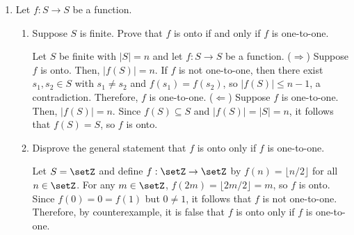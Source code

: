 \begin{enumerate}
\begin{enumerate}
\begin{subprove}
      Since \(g \circ f = h \circ f\), it follows that \((g \circ f)(s) = (h \circ f)(s)\).
      That is, \(g(f(s)) = h(f(s))\).
      Since \(f(s) = t\), it follows that \(g(t) = h(t)\).\proofstep
      Since \(t\) was arbitrary, it follows that for all \(t \in T\), \(g(t) = h(t)\).
      Therefore, \(g = h\).
    \end{subprove}
    \item Let \(h: S \to T\) be a function. Prove that if \(g\) is injective and \(g \circ f = g \circ h\), then \(f = h\).
    \begin{subprove}
      Let \(s \in S\) be arbitrary.
      Since \(g \circ f = g \circ h\), it follows that \((g \circ f)(s) = (g \circ h)(s)\).
      That is, \(g(f(s)) = g(h(s))\).
      Since \(g\) is injective, it follows that \(f(s) = h(s)\).\proofstep
      Since \(s\) was arbitrary, it follows that for all \(s \in S\), \(f(s) = h(s)\).
      Therefore, \(f = h\).
    \end{subprove}
  \end{enumerate}
  \item Let \(f: S \to S\) be a function.
  \begin{enumerate}
    \item Suppose \(S\) is finite. Prove that \(f\) is onto if and only if \(f\) is one-to-one.
    \begin{subprove}
      Let \(S\) be finite with \(|S| = n\) and let \(f: S \to S\) be a function.
      (\(\Rightarrow\)) Suppose \(f\) is onto. Then, \(|f(S)| = n\). 
      If \(f\) is not one-to-one, then there exist \(s_{1}, s_{2} \in S\) with \(s_{1} \neq s_{2}\) and \(f(s_{1}) = f(s_{2})\), 
      so \(|f(S)| \leq n - 1\), a contradiction. Therefore, \(f\) is one-to-one.
      (\(\Leftarrow\)) Suppose \(f\) is one-to-one. Then, \(|f(S)| = n\). 
      Since \(f(S) \subseteq S\) and \(|f(S)| = |S| = n\), it follows that \(f(S) = S\), so \(f\) is onto.
    \end{subprove}
    \item Disprove the general statement that \(f\) is onto only if \(f\) is one-to-one.
    \begin{subdisprove}
      Let \(S = \setZ\) and define \(f: \setZ \to \setZ\) by \(f(n) = \lfloor n/2 \rfloor\) for all \(n \in \setZ\).
      For any \(m \in \setZ\), \(f(2m) = \lfloor 2m/2 \rfloor = m\), so \(f\) is onto.
      Since \(f(0) = 0 = f(1)\) but \(0 \neq 1\), it follows that \(f\) is not one-to-one.\proofstep
      Therefore, by counterexample, it is false that \(f\) is onto only if \(f\) is one-to-one.

\end{subdisprove}
\end{enumerate}
\end{enumerate}
